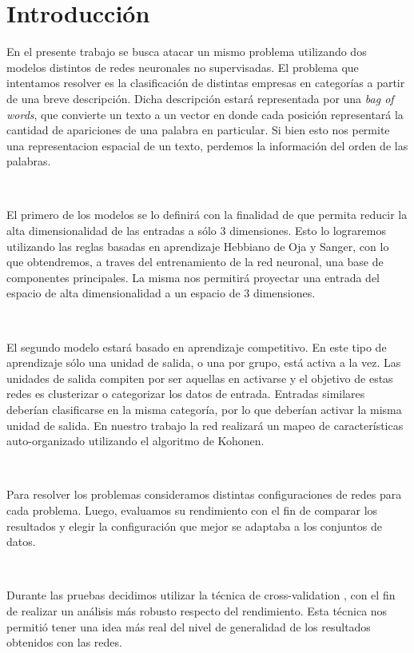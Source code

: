 \documentclass[informe.tex]{subfiles}
\begin{document}
  
  \section{Introducción}
  
  En el presente trabajo se busca atacar un mismo problema utilizando dos modelos distintos de redes neuronales no supervisadas. El problema que intentamos resolver es la clasificación de distintas empresas en categorías a partir de una breve descripción. Dicha descripción estará representada por una {\it bag of words}, que convierte un texto a un vector en donde cada posición representará la cantidad de apariciones de una palabra en particular. Si bien esto nos permite una representacion espacial de un texto, perdemos la información del orden de las palabras.
  
  ~

  El primero de los modelos se lo definirá con la finalidad de que permita reducir la alta dimensionalidad de las entradas a sólo 3 dimensiones. Esto lo lograremos utilizando las reglas basadas en aprendizaje Hebbiano de Oja y Sanger\cite{haykin}, con lo que obtendremos, a traves del entrenamiento de la red neuronal, una base de componentes principales. La misma nos permitirá proyectar una entrada del espacio de alta dimensionalidad a un espacio de 3 dimensiones.
  
  ~
  
  El segundo modelo estará basado en aprendizaje competitivo\cite{haykin}. En este tipo de aprendizaje sólo una unidad de salida, o una por grupo, está activa a la vez. Las unidades de salida compiten por ser aquellas en activarse y el objetivo de estas redes es clusterizar o categorizar los datos de entrada. Entradas similares deberían clasificarse en la misma categoría, por lo que deberían activar la misma unidad de salida. En nuestro trabajo la red realizará un mapeo de características auto-organizado utilizando el algoritmo de Kohonen.
  
  ~
  
  Para resolver los problemas consideramos distintas configuraciones de redes para cada problema. Luego, evaluamos su rendimiento con el fin de comparar los resultados y elegir la configuración que mejor se adaptaba a los conjuntos de datos.
  
  ~
  
  Durante las pruebas decidimos utilizar la técnica de cross-validation \cite{haykin}, con el fin de realizar un análisis más robusto respecto del rendimiento. Esta técnica nos permitió tener una idea más real del nivel de generalidad de los resultados obtenidos con las redes.
  
  
\end{document}
